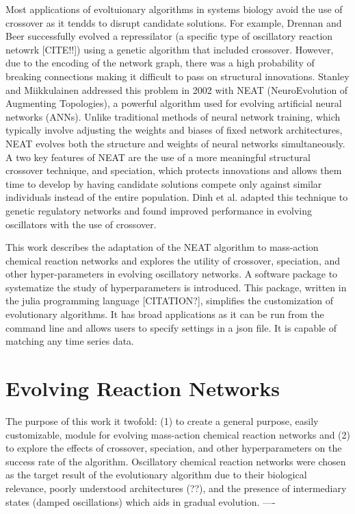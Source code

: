 \documentclass[12pt]{report}
\begin{document}
Most applications of evoltuionary algorithms in systems biology avoid the use of crossover as it tendds to disrupt candidate solutions. For example, Drennan and Beer successfully evolved a repressilator (a specific type of oscillatory reaction netowrk [CITE!!]) using a genetic algorithm that included crossover. However, due to the encoding of the network graph, there was a high probability of breaking connections making it difficult to pass on structural innovations. Stanley and Miikkulainen addressed this problem in 2002 with NEAT (NeuroEvolution of Augmenting Topologies), a powerful algorithm used for evolving artificial neural networks (ANNs). Unlike traditional methods of neural network training, which typically involve adjusting the weights and biases of fixed network architectures, NEAT evolves both the structure and weights of neural networks simultaneously. A two key features of NEAT are the use of a more meaningful structural crossover technique, and speciation, which protects innovations and allows them time to develop by having candidate solutions compete only against similar individuals instead of the entire population. Dinh et al. adapted this technique to genetic regulatory networks and found improved performance in evolving oscillators with the use of crossover.

This work describes the adaptation of the NEAT algorithm to mass-action chemical reaction networks and explores the utility of crossover, speciation, and other hyper-parameters in evolving oscillatory networks. A software package to systematize the study of hyperparameters is introduced. This package, written in the julia programming language [CITATION?], simplifies the customization of evolutionary algorithms. It has broad applications as it can be run from the command line and allows users to specify settings in a json file. It is capable of matching any time series data. 


\section{Evolving Reaction Networks}
The purpose of this work it twofold: (1) to create a general purpose, easily customizable, module for evolving mass-action chemical reaction networks and (2) to explore the effects of crossover,  speciation, and other hyperparameters on the success rate of the algorithm. Oscillatory chemical reaction networks were chosen as the target result of the evolutionary algorithm due to their biological relevance, poorly understood architectures (??), and the presence of intermediary states (damped oscillations) which aids in gradual evolution.
----
\end{document}
